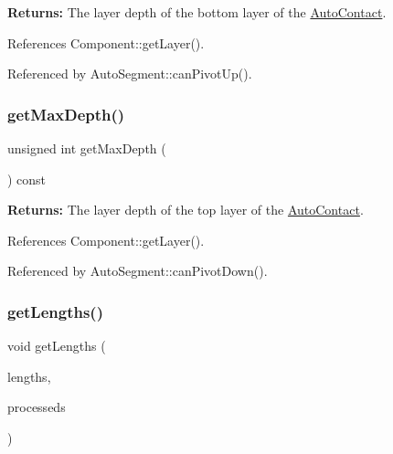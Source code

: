{\bfseries Returns\+:} The layer depth of the bottom layer of the \hyperlink{classKatabatic_1_1AutoContact}{Auto\+Contact}. 

References Component\+::get\+Layer().



Referenced by Auto\+Segment\+::can\+Pivot\+Up().

\mbox{\label{classKatabatic_1_1AutoContact_ac350bb9d2d038287530fcf474987ba55}} 
\subsubsection{\texorpdfstring{get\+Max\+Depth()}{getMaxDepth()}}
{\footnotesize\ttfamily unsigned int get\+Max\+Depth (\begin{DoxyParamCaption}{ }\end{DoxyParamCaption}) const}

{\bfseries Returns\+:} The layer depth of the top layer of the \hyperlink{classKatabatic_1_1AutoContact}{Auto\+Contact}. 

References Component\+::get\+Layer().



Referenced by Auto\+Segment\+::can\+Pivot\+Down().

\mbox{\label{classKatabatic_1_1AutoContact_ac607a624c0698056c5bccf405cf05ea7}} 
\subsubsection{\texorpdfstring{get\+Lengths()}{getLengths()}}
{\footnotesize\ttfamily void get\+Lengths (\begin{DoxyParamCaption}\item[{\textbf{ Db\+U\+::\+Unit} $\ast$}]{lengths,  }\item[{Auto\+Segment\+::\+Depth\+Length\+Set \&}]{processeds }\end{DoxyParamCaption})}


